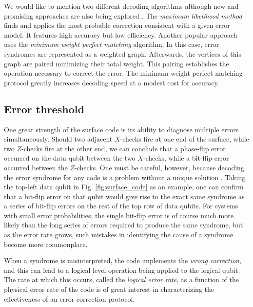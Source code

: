 We would like to mention two different decoding algorithms although new and
promising approaches are also being explored \cite{Varsamopoulos_2020}. The
\textit{maximum likelihood method} finds and applies the most probable
correction consistent with a given error model. It features high accuracy but
low efficiency. Another popular approach uses the \textit{minimum weight perfect
  matching} \cite{fowler2013minimum} algorithm. In this case, error syndromes
are represented as a weighted graph. Afterwards, the vertices of this graph are
paired minimizing their total weight. This pairing establishes the operation
necessary to correct the error. The minimum weight perfect matching protocol
greatly increases decoding speed at a modest cost for accuracy.

\subsection{Error threshold}
One great strength of the surface code is its ability to diagnose multiple
errors simultaneously. Should two adjacent $X$-checks fire at one end of the
surface, while two $Z$-checks fire at the other end, we can conclude that a
phase-flip error occurred on the data qubit between the two $X$-checks, while a
bit-flip error occurred between the $Z$-checks. One must be careful, however,
because decoding the error syndrome for any code is a problem without a unique
solution \cite{terhal15}. Taking the top-left data qubit in Fig.
\ref{fig:surface_code} as an example, one can confirm that a bit-flip error on
that qubit would give rise to the exact same syndrome as a series of bit-flip
errors on the rest of the top row of data qubits. For systems with small error
probabilities, the single bit-flip error is of course much more likely than the
long series of errors required to produce the same syndrome, but as the error
rate grows, such mistakes in identifying the cause of a syndrome become more
commonplace.

When a syndrome is misinterpreted, the code implements the \textit{wrong
  correction}, and this can lead to a logical level operation being applied to
the logical qubit. The rate at which this occurs, called the \textit{logical
  error rate}, as a function of the physical error rate of the code is of great
interest in characterizing the effectiveness of an error correction protocol.

